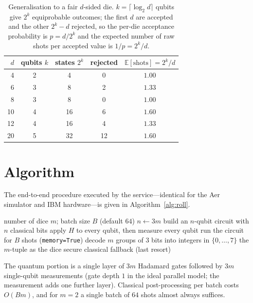 \documentclass{ieeeaccess}
\begin{document}
\begin{table}[tbp]
\centering
\caption{Generalisation to a fair $d$-sided die. $k=\lceil\log_2 d\rceil$ qubits give $2^k$ equiprobable outcomes; the first $d$ are accepted and the other $2^k-d$ rejected, so the per-die acceptance probability is $p=d/2^k$ and the expected number of raw shots per accepted value is $1/p=2^k/d$.}
\label{tab:gen}
\begin{tabular}{rcccc}
\toprule
$d$ & qubits $k$ & states $2^k$ & rejected & $\mathbb{E}[\text{shots}]=2^k/d$ \\
\midrule
4  & 2 & 4  & 0  & $1.00$ \\
6  & 3 & 8  & 2  & $1.33$ \\
8  & 3 & 8  & 0  & $1.00$ \\
10 & 4 & 16 & 6  & $1.60$ \\
12 & 4 & 16 & 4  & $1.33$ \\
20 & 5 & 32 & 12 & $1.60$ \\
\bottomrule
\end{tabular}
\end{table}

\section{Algorithm}

The end-to-end procedure executed by the service---identical for the Aer simulator and IBM hardware---is given in Algorithm~\ref{alg:roll}.

\begin{algorithm}[tbp]
\caption{Quantum dice roll served by the QBaaS endpoint (identical for the Aer simulator and IBM hardware).}
\label{alg:roll}
\begin{algorithmic}[1]
\Require number of dice $m$; batch size $B$ (default $64$)
\State $n \gets 3m$
\State build an $n$-qubit circuit with $n$ classical bits
\State apply $H$ to every qubit, then measure every qubit
  \State run the circuit for $B$ shots (\texttt{memory=True})
    \State decode $m$ groups of $3$ bits into integers in $\{0,\dots,7\}$
      \State \Return the $m$-tuple as the dice
    \EndIf
  \EndFor
\EndFor
\State \Return secure classical fallback (last resort)
\end{algorithmic}
\end{algorithm}

The quantum portion is a single layer of $3m$ Hadamard gates followed by $3m$ single-qubit measurements (gate depth $1$ in the ideal parallel model; the measurement adds one further layer). Classical post-processing per batch costs $O(Bm)$, and for $m=2$ a single batch of $64$ shots almost always suffices.
\end{document}
